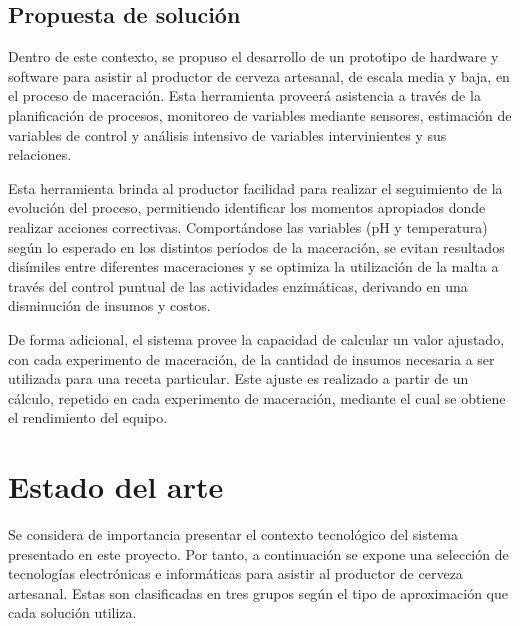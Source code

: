     
    
    
    
    
	
	
	\subsection{ Propuesta de solución }
	\par
    Dentro de este contexto, se propuso el desarrollo de un prototipo de hardware y software para asistir al productor de cerveza artesanal, de escala media y baja, en el proceso de maceración. Esta herramienta proveerá asistencia a través de la planificación de procesos, monitoreo de variables mediante sensores, estimación de variables de control y análisis intensivo de variables intervinientes y sus relaciones.
    \par
    Esta herramienta brinda al productor facilidad para realizar el seguimiento de la evolución del proceso, permitiendo identificar los momentos apropiados donde realizar acciones correctivas. Comportándose las variables (pH y temperatura) según lo esperado en los distintos períodos de la maceración, se evitan resultados disímiles entre diferentes maceraciones y se optimiza la utilización de la malta a través del control puntual de las actividades enzimáticas, derivando en una disminución de insumos y costos.
    \par
    De forma adicional, el sistema provee la capacidad de calcular un valor ajustado, con cada experimento de maceración, de la cantidad de insumos necesaria a ser utilizada para una receta particular. Este ajuste es realizado a partir de un cálculo, repetido en cada experimento de maceración, mediante el cual se obtiene el rendimiento del equipo.
    
\section{Estado del arte}
\label{seccionEstadoDelArte}
    \par
    Se considera de importancia presentar el contexto tecnológico del sistema presentado en este proyecto. Por tanto, a continuación se expone una selección de tecnologías electrónicas e informáticas para asistir al productor de cerveza artesanal. Estas son clasificadas en tres grupos según el tipo de aproximación que cada solución utiliza.
    
